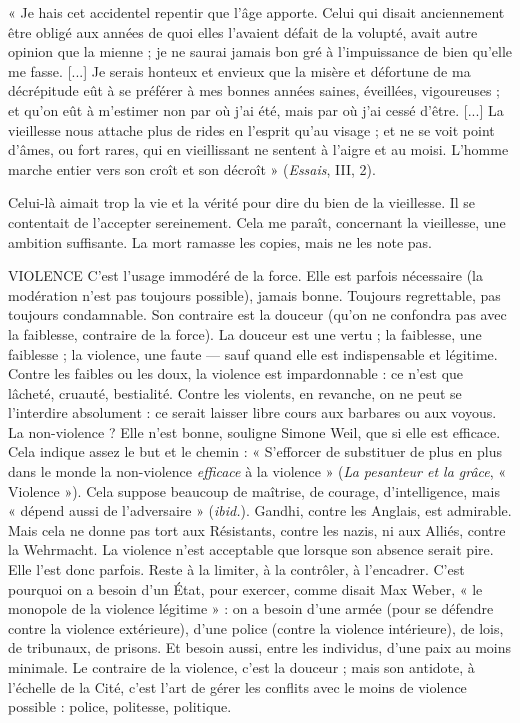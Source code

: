 « Je hais cet accidentel repentir que l’âge apporte. Celui qui disait anciennement
être obligé aux années de quoi elles l'avaient défait de la volupté, avait autre opinion
que la mienne ; je ne saurai jamais bon gré à l’impuissance de bien qu’elle me fasse.
[...] Je serais honteux et envieux que la misère et défortune de ma décrépitude eût à se
préférer à mes bonnes années saines, éveillées, vigoureuses ; et qu’on eût à m’estimer
non par où j'ai été, mais par où j'ai cessé d’être. [...] La vieillesse nous attache plus de
rides en l'esprit qu’au visage ; et ne se voit point d’âmes, ou fort rares, qui en vieillissant
ne sentent à l’aigre et au moisi. L'homme marche entier vers son croît et son décroît »
({\it Essais}, III, 2).

Celui-là aimait trop la vie et la vérité pour dire du bien de la vieillesse. Il se
contentait de l’accepter sereinement. Cela me paraît, concernant la vieillesse,
une ambition suffisante. La mort ramasse les copies, mais ne les note pas.

VIOLENCE C'est l’usage immodéré de la force. Elle est parfois nécessaire (la
modération n’est pas toujours possible), jamais bonne. Toujours
regrettable, pas toujours condamnable. Son contraire est la douceur
(qu’on ne confondra pas avec la faiblesse, contraire de la force). La douceur est
une vertu ; la faiblesse, une faiblesse ; la violence, une faute — sauf quand elle
est indispensable et légitime. Contre les faibles ou les doux, la violence est
impardonnable : ce n’est que lâcheté, cruauté, bestialité. Contre les violents, en
revanche, on ne peut se l’interdire absolument : ce serait laisser libre cours aux
barbares ou aux voyous. La non-violence ? Elle n’est bonne, souligne Simone
Weil, que si elle est efficace. Cela indique assez le but et le chemin : « S’efforcer
de substituer de plus en plus dans le monde la non-violence {\it efficace} à la
violence » ({\it La pesanteur et la grâce}, « Violence »). Cela suppose beaucoup de
maîtrise, de courage, d'intelligence, mais « dépend aussi de l’adversaire » ({\it ibid.}).
Gandhi, contre les Anglais, est admirable. Mais cela ne donne pas tort aux
Résistants, contre les nazis, ni aux Alliés, contre la Wehrmacht. La violence
n’est acceptable que lorsque son absence serait pire. Elle l’est donc parfois.
Reste à la limiter, à la contrôler, à l’encadrer. C’est pourquoi on a besoin d’un
État, pour exercer, comme disait Max Weber, « le monopole de la violence
légitime » : on a besoin d’une armée (pour se défendre contre la violence extérieure),
d’une police (contre la violence intérieure), de lois, de tribunaux, de
prisons. Et besoin aussi, entre les individus, d’une paix au moins minimale.
Le contraire de la violence, c’est la douceur ; mais son antidote, à l'échelle de la
Cité, c’est l’art de gérer les conflits avec le moins de violence possible : police,
politesse, politique.

